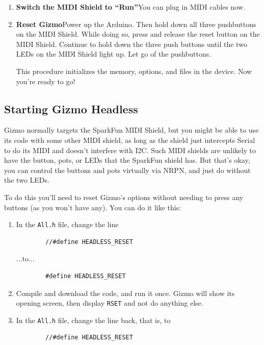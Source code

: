 \documentclass{article}
\begin{document}
\begin{enumerate}
\item {\bf Switch the MIDI Shield to ``Run''}\quad  You can plug in MIDI cables now.

\item {\bf Reset Gizmo}\quad Power up the Arduino.  Then hold down all three pushbuttons on the MIDI Shield.  While doing so, press and release the reset button on the MIDI Shield.  Continue to hold down the three push buttons until the two LEDs on the MIDI Shield light up.  Let go of the pushbuttons.  

This procedure initializes the memory, options, and files in the device.  Now you're ready to go!

\end{enumerate}

\subsection{Starting Gizmo Headless}

Gizmo normally targets the SparkFun MIDI Shield, but you might be able to use its code with some other MIDI shield, as long as the shield just intercepts Serial to do its MIDI and doesn't interfere with I2C.  Such MIDI shields are unlikely to have the button, pots, or LEDs that the SparkFun shield has.  But that's okay, you can control the buttons and pots virtually via NRPN, and just do without the two LEDs.

To do this you'll need to reset Gizmo's options without needing to press any buttons (as you won't have any).  You can do it like this:

\begin{enumerate}
\item In the \texttt{All.h} file, change the line 
\begin{verbatim}
        //#define HEADLESS_RESET
\end{verbatim}
...to...
\begin{verbatim}
        #define HEADLESS_RESET
\end{verbatim}
\item Compile and download the code, and run it once.  Gizmo will show its opening screen, then display \texttt{RSET} and not do anything else.
\item In the \texttt{All.h} file, change the line back, that is, to 
\begin{verbatim}
        //#define HEADLESS_RESET
\end{verbatim}

\end{enumerate}
\end{document}
